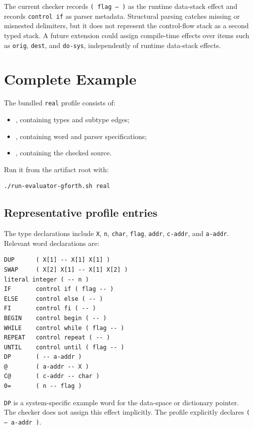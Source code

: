 \documentclass[11pt,a4paper]{article}
\newcommand{\stackeffect}[1]{\mbox{\texttt{#1}}}
\begin{document}
The current checker records \stackeffect{( flag -- )} as the runtime data-stack
effect and records \texttt{control if} as parser metadata.  Structural parsing
catches missing or misnested delimiters, but it does not represent the
control-flow stack as a second typed stack.  A future extension could assign
compile-time effects over items such as \texttt{orig}, \texttt{dest}, and
\texttt{do-sys}, independently of runtime data-stack effects.

\section{Complete Example}
\label{sec:example}

The bundled \texttt{real} profile consists of:

\begin{itemize}
  \item {}, containing types and subtype edges;
  \item {}, containing word and parser specifications;
  \item {}, containing the checked source.
\end{itemize}

Run it from the artifact root with:

\begin{lstlisting}
./run-evaluator-gforth.sh real
\end{lstlisting}

\subsection{Representative profile entries}

The type declarations include \texttt{X}, \texttt{n}, \texttt{char},
\texttt{flag}, \texttt{addr}, \texttt{c-addr}, and \texttt{a-addr}.  Relevant
word declarations are:

\begin{lstlisting}
DUP      ( X[1] -- X[1] X[1] )
SWAP     ( X[2] X[1] -- X[1] X[2] )
literal integer ( -- n )
IF       control if ( flag -- )
ELSE     control else ( -- )
FI       control fi ( -- )
BEGIN    control begin ( -- )
WHILE    control while ( flag -- )
REPEAT   control repeat ( -- )
UNTIL    control until ( flag -- )
DP       ( -- a-addr )
@        ( a-addr -- X )
C@       ( c-addr -- char )
0=       ( n -- flag )
\end{lstlisting}

\texttt{DP} is a system-specific example word for the data-space or dictionary
pointer.  The checker does not assign this effect implicitly.  The profile
explicitly declares \stackeffect{( -- a-addr )}.
\end{document}
